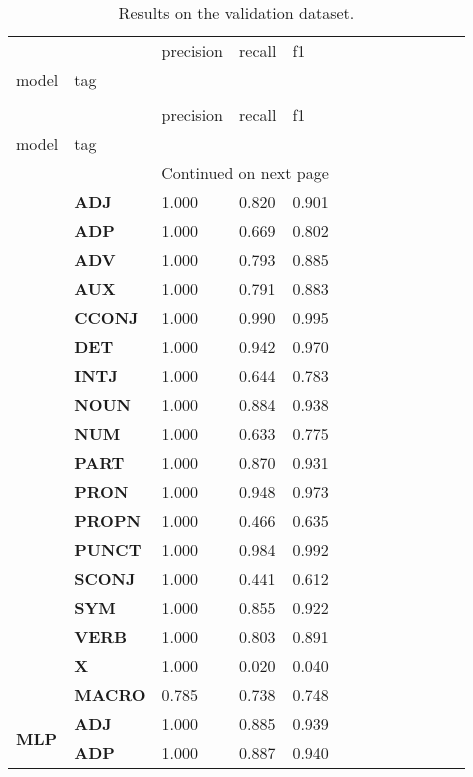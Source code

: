 \begin{longtable}{|l||l||l||l||l||l||l||l||l||l||l||l||l|}
\caption{Results on the validation dataset.} \label{tab::ex_3_valid} \\
\toprule
 &  & precision & recall & f1 \\
model & tag &  &  &  \\
\midrule
\endfirsthead
\caption[]{Results on the validation dataset.} \\
\toprule
 &  & precision & recall & f1 \\
model & tag &  &  &  \\
\midrule
\endhead
\midrule
\multicolumn{5}{r}{Continued on next page} \\
\midrule
\endfoot
\bottomrule
\endlastfoot
\multirow[t]{18}{*}{\textbf{Baseline}} & \textbf{ADJ} & 1.000 & 0.820 & 0.901 \\
\textbf{} & \textbf{ADP} & 1.000 & 0.669 & 0.802 \\
\textbf{} & \textbf{ADV} & 1.000 & 0.793 & 0.885 \\
\textbf{} & \textbf{AUX} & 1.000 & 0.791 & 0.883 \\
\textbf{} & \textbf{CCONJ} & 1.000 & 0.990 & 0.995 \\
\textbf{} & \textbf{DET} & 1.000 & 0.942 & 0.970 \\
\textbf{} & \textbf{INTJ} & 1.000 & 0.644 & 0.783 \\
\textbf{} & \textbf{NOUN} & 1.000 & 0.884 & 0.938 \\
\textbf{} & \textbf{NUM} & 1.000 & 0.633 & 0.775 \\
\textbf{} & \textbf{PART} & 1.000 & 0.870 & 0.931 \\
\textbf{} & \textbf{PRON} & 1.000 & 0.948 & 0.973 \\
\textbf{} & \textbf{PROPN} & 1.000 & 0.466 & 0.635 \\
\textbf{} & \textbf{PUNCT} & 1.000 & 0.984 & 0.992 \\
\textbf{} & \textbf{SCONJ} & 1.000 & 0.441 & 0.612 \\
\textbf{} & \textbf{SYM} & 1.000 & 0.855 & 0.922 \\
\textbf{} & \textbf{VERB} & 1.000 & 0.803 & 0.891 \\
\textbf{} & \textbf{X} & 1.000 & 0.020 & 0.040 \\
\textbf{} & \textbf{MACRO} & 0.785 & 0.738 & 0.748 \\
\cline{1-5}
\multirow[t]{18}{*}{\textbf{MLP}} & \textbf{ADJ} & 1.000 & 0.885 & 0.939 \\
\textbf{} & \textbf{ADP} & 1.000 & 0.887 & 0.940 \\

\end{longtable}
